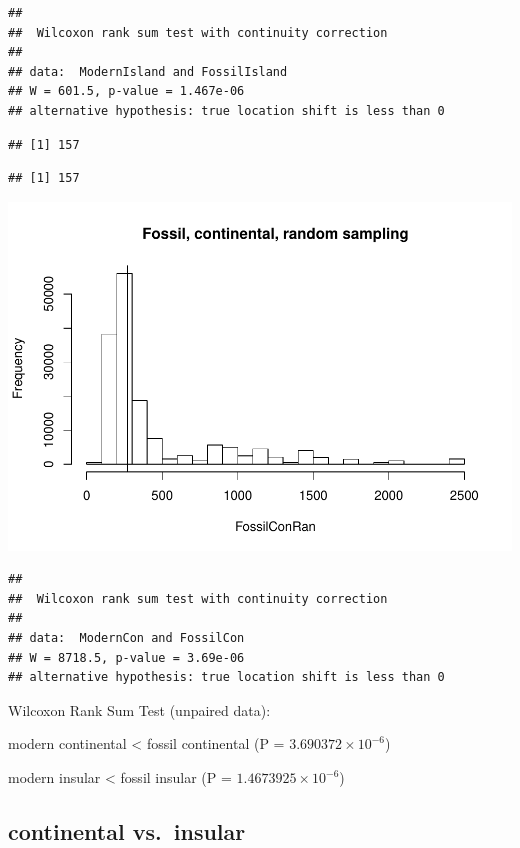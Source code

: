 \documentclass[]{article}
\begin{document}
\begin{verbatim}
## 
##  Wilcoxon rank sum test with continuity correction
## 
## data:  ModernIsland and FossilIsland
## W = 601.5, p-value = 1.467e-06
## alternative hypothesis: true location shift is less than 0
\end{verbatim}

\begin{verbatim}
## [1] 157
\end{verbatim}

\begin{verbatim}
## [1] 157
\end{verbatim}

\includegraphics{MA_JJ_files/figure-latex/RSMFCI-2.pdf}

\begin{verbatim}
## 
##  Wilcoxon rank sum test with continuity correction
## 
## data:  ModernCon and FossilCon
## W = 8718.5, p-value = 3.69e-06
## alternative hypothesis: true location shift is less than 0
\end{verbatim}

Wilcoxon Rank Sum Test (unpaired data):

modern continental \textless{} fossil continental (P =
\(3.690372\times 10^{-6}\))

modern insular \textless{} fossil insular (P =
\(1.4673925\times 10^{-6}\))

\newpage

\subsection{continental vs.~insular}\label{continental-vs.insular-1}
\end{document}
